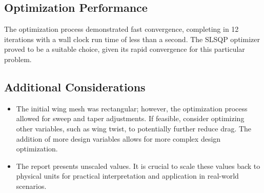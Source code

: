 \documentclass{article}
\begin{document}
\subsection*{Optimization Performance}

The optimization process demonstrated fast convergence, completing in 12 iterations with a wall clock run time of less than a second. The SLSQP optimizer proved to be a suitable choice, given its rapid convergence for this particular problem.

\subsection*{Additional Considerations}

\begin{itemize}
    \item The initial wing mesh was rectangular; however, the optimization process allowed for sweep and taper adjustments. If feasible, consider optimizing other variables, such as wing twist, to potentially further reduce drag. The addition of more design variables allows for more complex design optimization.
    \item The report presents unscaled values. It is crucial to scale these values back to physical units for practical interpretation and application in real-world scenarios.
\end{itemize}
\end{document}
